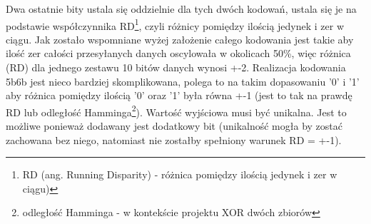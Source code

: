 \documentclass{BscUS}
\begin{document}
Dwa ostatnie bity ustala się oddzielnie dla tych dwóch kodowań, ustala się je na podstawie współczynnika RD\footnote{RD (ang. Running Disparity) - różnica pomiędzy ilością jedynek i zer w ciągu)}, czyli różnicy pomiędzy ilością jedynek i zer w ciągu. Jak zostało wspomniane wyżej założenie całego kodowania jest takie aby ilość zer całości przesyłanych danych oscylowała w okolicach 50\%, więc różnica (RD) dla jednego zestawu 10 bitów danych wynosi +-2.
\newline
\indent Realizacja kodowania 5b\/6b jest nieco bardziej skomplikowana, polega to na takim dopasowaniu '0' i '1' aby różnica pomiędzy ilością '0' oraz '1' była równa +-1 (jest to tak na prawdę RD lub odległość Hamminga\footnote{odległość Hamminga - w kontekście projektu XOR dwóch zbiorów}). Wartość wyjściowa musi być unikalna. Jest to możliwe ponieważ dodawany jest dodatkowy bit (unikalność mogła by zostać zachowana bez niego, natomiast nie zostałby spełniony warunek RD = +-1).
\newline 
\end{document}
